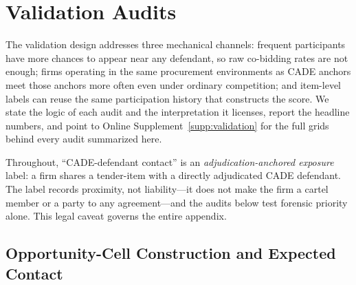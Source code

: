 \section{Validation Audits}
\label{app:validation_audits_submission}

The validation design addresses three mechanical channels: frequent
participants have more chances to appear near any defendant, so raw
co-bidding rates are not enough; firms operating in the same procurement
environments as CADE anchors meet those anchors more often even under
ordinary competition; and item-level labels can reuse the same
participation history that constructs the score. We state the logic of
each audit and the interpretation it licenses, report the headline
numbers, and point to Online Supplement~\ref{supp:validation} for the
full grids behind every audit summarized here.

Throughout, ``CADE-defendant contact'' is an
\emph{adjudication-anchored exposure} label: a firm shares a
tender-item with a directly adjudicated CADE defendant. The label
records proximity, not liability---it does not make the firm a cartel
member or a party to any agreement---and the audits below test forensic
priority alone. This legal caveat governs the entire appendix.

\subsection{Opportunity-Cell Construction and Expected Contact}
\label{app:opp_cells_submission}
\label{app:market_opportunity_submission}
\label{app:expected_contact_submission}

